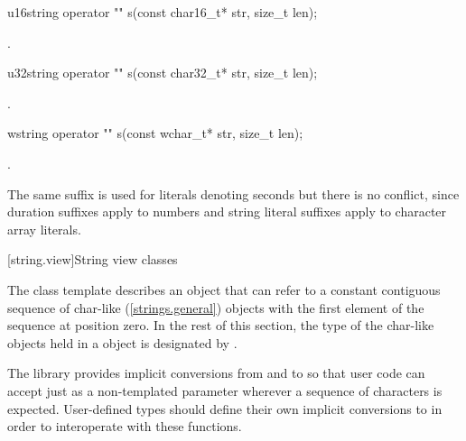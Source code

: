 %
\begin{itemdecl}
u16string operator "" s(const char16_t* str, size_t len);
\end{itemdecl}
\begin{itemdescr}
\pnum
\returns
{}.
\end{itemdescr}

%
\begin{itemdecl}
u32string operator "" s(const char32_t* str, size_t len);
\end{itemdecl}
\begin{itemdescr}
\pnum
\returns
{}.
\end{itemdescr}

%
\begin{itemdecl}
wstring operator "" s(const wchar_t* str, size_t len);
\end{itemdecl}
\begin{itemdescr}
\pnum
\returns
{}.
\end{itemdescr}

\pnum \begin{note}
The same suffix  is used for  literals denoting seconds but there is no conflict, since duration suffixes apply to numbers and string literal suffixes apply to character array literals.
\end{note}

[string.view]{String view classes}

\pnum
The class template  describes an object that can refer to a constant contiguous sequence of char-like (\ref{strings.general}) objects with the first element of the sequence at position zero.
In the rest of this section, the type of the char-like objects held in a  object is designated by .

\pnum
\begin{note}
The library provides implicit conversions from  and  to  so that user code can accept just  as a non-templated parameter wherever a sequence of characters is expected.
User-defined types should define their own implicit conversions to  in order to interoperate with these functions.
\end{note}

